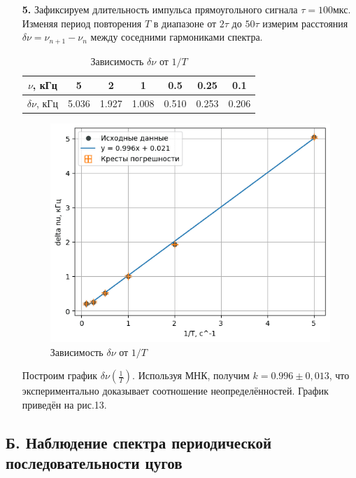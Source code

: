 \documentclass[a4paper,12pt]{article} %
\begin{document}
\begin{enumerate}
	\item[\textbf{5.}]
		Зафиксируем длительность импульса прямоугольного сигнала $\tau = 100 \text{мкс}$. Изменяя период повторения $T$ в диапазоне от $2\tau$ до $50\tau$ измерим расстояния $\delta\nu = \nu_{n+1} - \nu_n$ между соседними гармониками спектра.
		\begin{table}[h!]
			\centering
			\begin{tabular}{|c|c|c|c|c|c|c|}
				\hline
				$\nu$, кГц        & 5     & 2     & 1     & 0.5   & 0.25  & 0.1   \\ \hline
				$\delta \nu$, кГц & 5.036 & 1.927 & 1.008 & 0.510 & 0.253 & 0.206 \\ \hline
			\end{tabular}
			\caption{Зависимость $\delta \nu$ от $1/T$}
			\label{table3}
		\end{table}

		\newpage

		\begin{figure}[h]
			\centering
			\includegraphics[width=0.7\linewidth]{grafic2.png}
			\caption{Зависимость $\delta \nu$ от $1/T$}
			\label{grafic2}
		\end{figure}
		Построим график $\delta\nu\left(\frac{1}{T}\right)$. Используя МНК, получим $k=0.996\pm0,013$, что экспериментально доказывает соотношение неопределённостей. График приведён на рис.13.
\end{enumerate}













\subsection*{Б. Наблюдение спектра периодической последовательности цугов}
\end{document}
